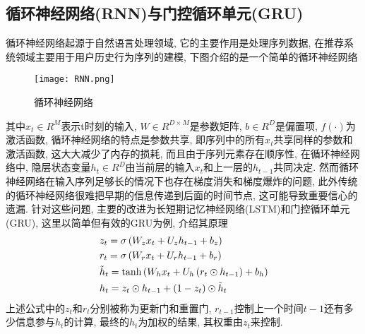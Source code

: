 \subsection{循环神经网络(RNN)与门控循环单元(GRU)}
循环神经网络起源于自然语言处理领域, 它的主要作用是处理序列数据, 在推荐系统领域主要用于用户历史行为序列的建模, 下图介绍的是一个简单的循环神经网络
\begin{figure}[htbp]
	\centering
	\texttt{[image: RNN.png]}
	\caption{循环神经网络}
	\label{FIGhtmltext}
\end{figure}
其中$x_t \in R^{M}$表示t时刻的输入, $W \in R^{D\times M}$是参数矩阵, $b \in R^D$是偏置项, $f(\cdot)$为激活函数, 循环神经网络的特点是参数共享, 即序列中的所有$x_t$共享同样的参数和激活函数, 这大大减少了内存的损耗, 而且由于序列元素存在顺序性, 在循环神经网络中, 隐层状态变量$h_t \in R^D$由当前层的输入$x_t$和上一层的$h_{t-1}$共同决定. 然而循环神经网络在输入序列足够长的情况下也存在梯度消失和梯度爆炸的问题, 此外传统的循环神经网络很难把早期的信息传递到后面的时间节点, 这可能导致重要信心的遗漏. 针对这些问题, 主要的改进为长短期记忆神经网络(LSTM)和门控循环单元(GRU), 这里以简单但有效的GRU为例, 介绍其原理
\begin{equation}
	\begin{gathered}
		z_{t}=\sigma\left(W_{z} x_{t}+U_{z} h_{t-1}+b_{z}\right) \hfill \\
		r_{t}=\sigma\left(W_{r} x_{t}+U_{r} h_{t-1}+b_{r}\right) \hfill \\
		\tilde{h}_{t}=\tanh \left(W_{h} x_{t}+U_{h}\left(r_{t} \odot h_{t-1}\right)+b_{h}\right) \hfill \\
		h_{t}=z_{t} \odot h_{t-1}+\left(1-z_{t}\right) \odot \tilde{h}_{t}\hfill \\
	\end{gathered}
\end{equation}
上述公式中的$z_t$和$r_t$分别被称为更新门和重置门, $r_{t-1}$控制上一个时间$t-1$还有多少信息参与$h_t$的计算, 最终的$h_t$为加权的结果, 其权重由$z_t$来控制.
